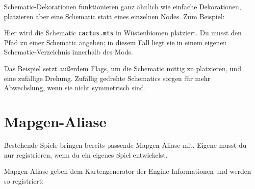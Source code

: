 Schematic-Dekorationen funktionieren ganz ähnlich wie einfache
Dekorationen, platzieren aber eine Schematic statt eines einzelnen
Nodes. Zum Beispiel:

\begin{Shaded}
\begin{Highlighting}[]
\OperatorTok{(\{}
     \OperatorTok{=} \OperatorTok{,}
     \OperatorTok{=} \OperatorTok{\{}  \OperatorTok{\},}
     \OperatorTok{=} \OperatorTok{,}
     \OperatorTok{=} \OperatorTok{,}
     \OperatorTok{=} \OperatorTok{\{}  \OperatorTok{\},}
     \OperatorTok{=} \OperatorTok{,}
     \OperatorTok{=} \OperatorTok{,}
     \OperatorTok{=} \OperatorTok{(}\OperatorTok{)}
         \OperatorTok{,}
     \OperatorTok{=} \OperatorTok{,}
     \OperatorTok{=} \OperatorTok{,}
\OperatorTok{\})}
\end{Highlighting}
\end{Shaded}

Hier wird die Schematic \texttt{cactus.\allowbreak{}mts} in Wüstenbiomen
platziert. Du musst den Pfad zu einer Schematic angeben; in diesem Fall
liegt sie in einem eigenen Schematic-Verzeichnis innerhalb des Mods.

Das Beispiel setzt außerdem Flags, um die Schematic mittig zu
platzieren, und eine zufällige Drehung. Zufällig gedrehte Schematics
sorgen für mehr Abwechslung, wenn sie nicht symmetrisch sind.

\section{Mapgen-Aliase}\label{mapgen-aliase}

Bestehende Spiele bringen bereits passende Mapgen-Aliase mit. Eigene
musst du nur registrieren, wenn du ein eigenes Spiel entwickelst.

Mapgen-Aliase geben dem Kartengenerator der Engine Informationen und
werden so registriert:


